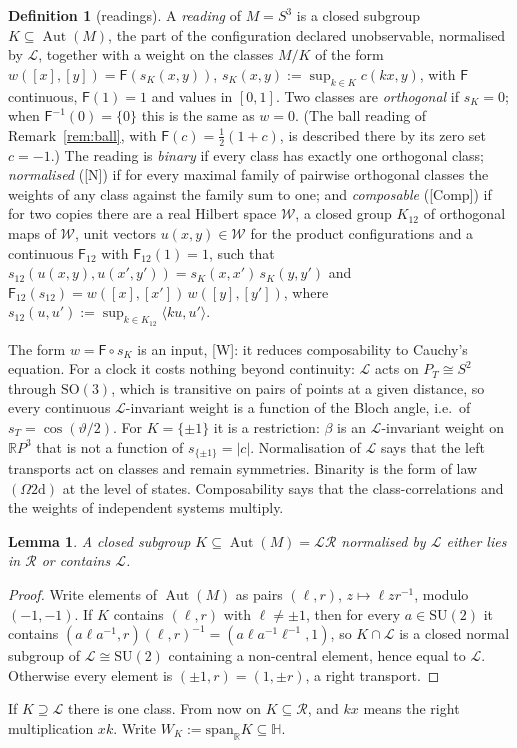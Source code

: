 \documentclass[aps,pra,onecolumn,superscriptaddress,nofootinbib,10pt]{revtex4-2}
\newtheorem{lemma}[theorem]{Lemma}
\theoremstyle{definition}
\newtheorem{definition}[theorem]{Definition}
\theoremstyle{remark}
\newcommand{\R}{\mathbb{R}}
\newcommand{\HH}{\mathbb{H}}
\newcommand{\cL}{\mathcal{L}}
\newcommand{\cR}{\mathcal{R}}
\newcommand{\Aut}{\operatorname{Aut}}
\newcommand{\ip}[2]{\langle #1,#2\rangle}
\newcommand{\SU}{\mathrm{SU}}
\newcommand{\SO}{\mathrm{SO}}
\begin{document}
\begin{definition}[readings]\label{def:reading}
A \emph{reading} of $M=S^3$ is a closed subgroup $K\subseteq\Aut(M)$, the part of the configuration
declared unobservable, normalised by $\cL$, together with a weight on the classes $M/K$ of the form
$w([x],[y])=\mathsf F(s_K(x,y))$, $s_K(x,y):=\sup_{k\in K}c(kx,y)$, with $\mathsf F$ continuous, $\mathsf F(1)=1$ and values in
$[0,1]$.  Two classes are \emph{orthogonal} if $s_K=0$; when $\mathsf F^{-1}(0)=\{0\}$ this is the same as $w=0$.  (The
ball reading of Remark~\ref{rem:ball}, with $\mathsf F(c)=\frac12(1+c)$, is described there by its zero set $c=-1$.)  The reading is
\emph{binary} if every class has exactly one orthogonal class;
\emph{normalised} ([N]) if for every maximal family of pairwise orthogonal classes the weights of any
class against the family sum to one; and
\emph{composable} ([Comp]) if for two copies there are a real Hilbert space $\mathcal W$, a closed group $K_{12}$ of
orthogonal maps of $\mathcal W$, unit vectors $u(x,y)\in \mathcal W$ for the product configurations and a continuous
$\mathsf F_{12}$ with $\mathsf F_{12}(1)=1$, such that
$s_{12}(u(x,y),u(x',y'))=s_K(x,x')\,s_K(y,y')$ and $\mathsf F_{12}(s_{12})=w([x],[x'])\,w([y],[y'])$, where
$s_{12}(u,u'):=\sup_{k\in K_{12}}\ip{ku}{u'}$.
\end{definition}
The form $w=\mathsf F\circ s_K$ is an input, [W]: it reduces composability to Cauchy's equation.  For a clock it
costs nothing beyond continuity: $\cL$ acts on $P_T\cong S^2$ through $\SO(3)$, which is transitive on pairs of
points at a given distance, so every continuous $\cL$-invariant weight is a function of the Bloch angle,
i.e.\ of $s_T=\cos(\vartheta/2)$.  For $K=\{\pm1\}$ it is a restriction: $\beta$ is an $\cL$-invariant weight on
$\R P^3$ that is not a function of $s_{\{\pm1\}}=\lvert c\rvert$.
Normalisation of $\cL$ says that the left transports act on classes and remain symmetries.  Binarity is
the form of law $(\Omega2\mathrm d)$ at the level of states.  Composability says that the class-correlations
and the weights of independent systems multiply.

\begin{lemma}\label{lem:normaliser}
A closed subgroup $K\subseteq\Aut(M)=\cL\cR$ normalised by $\cL$ either lies in $\cR$ or contains $\cL$.
\end{lemma}
\begin{proof}
Write elements of $\Aut(M)$ as pairs $(\ell,r)$, $z\mapsto\ell zr^{-1}$, modulo $(-1,-1)$.  If $K$ contains $(\ell,r)$ with
$\ell\ne\pm1$, then for every $a\in\SU(2)$ it contains $(a\ell a^{-1},r)(\ell,r)^{-1}=(a\ell a^{-1}\ell^{-1},1)$, so
$K\cap\cL$ is a closed normal subgroup of $\cL\cong\SU(2)$ containing a non-central element, hence equal to
$\cL$.  Otherwise every element is $(\pm1,r)=(1,\pm r)$, a right transport.
\end{proof}
If $K\supseteq\cL$ there is one class.  From now on $K\subseteq\cR$, and $kx$ means the right multiplication $xk$.
Write $W_K:=\mathrm{span}_\R K\subseteq\HH$.
\end{document}
